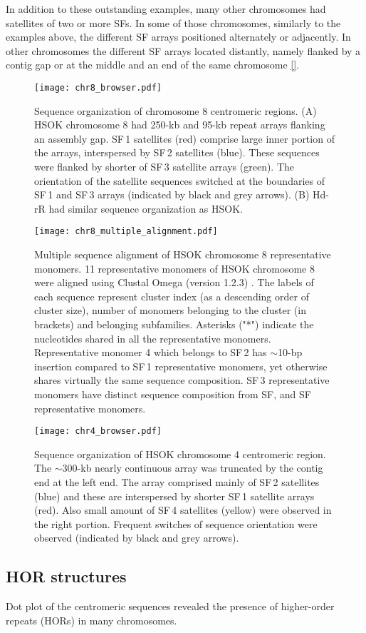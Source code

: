   In addition to these outstanding examples, many other chromosomes had satellites of two or more SFs. In some of those chromosomes, similarly to the examples above, the different SF arrays positioned alternately or adjacently. In other chromosomes the different SF arrays located distantly, namely flanked by a contig gap or at the middle and an end of the same chromosome \ref{}.


  \begin{figure*}
    \centering
    \texttt{[image: chr8\_browser.pdf]}
    \caption{
      Sequence organization of chromosome 8 centromeric regions. (A) HSOK chromosome 8 had 250-kb and 95-kb repeat arrays flanking an assembly gap. SF\,1 satellites (red) comprise large inner portion of the arrays, interspersed by SF\,2 satellites (blue). These sequences were flanked by shorter of SF\,3 satellite arrays (green). The orientation of the satellite sequences switched at the boundaries of SF\,1 and SF\,3 arrays (indicated by black and grey arrows). (B) Hd-rR had similar sequence organization as HSOK.
    }
    \label{chr8_browser}
  \end{figure*}

  \begin{figure*}
    \centering
    \texttt{[image: chr8\_multiple\_alignment.pdf]}
    \caption{
      Multiple sequence alignment of HSOK chromosome 8 representative monomers. 11 representative monomers of HSOK chromosome 8 were aligned using Clustal Omega (version 1.2.3) \cite{Sievers2011}. The labels of each sequence represent cluster index (as a descending order of cluster size), number of monomers belonging to the cluster (in brackets) and belonging subfamilies. Asterisks ("*") indicate the nucleotides shared in all the representative monomers. Representative monomer 4 which belongs to SF\,2 has $\sim$10-bp insertion compared to SF\,1 representative monomers, yet otherwise shares virtually the same sequence composition. SF\,3 representative monomers have distinct sequence composition from SF\1, and SF\2 representative monomers.
    }
    \label{chr8_multiple_alignment}
  \end{figure*}

  \begin{figure*}
    \centering
    \texttt{[image: chr4\_browser.pdf]}
    \caption{
      Sequence organization of HSOK chromosome 4 centromeric region. The $\sim$300-kb nearly continuous array was truncated by the contig end at the left end. The array comprised mainly of SF\,2 satellites (blue) and these are interspersed by shorter SF\,1 satellite arrays (red). Also small amount of SF\,4 satellites (yellow) were observed in the right portion. Frequent switches of sequence orientation were observed (indicated by black and grey arrows).
    }
    \label{chr4_browser}
  \end{figure*}


\subsection*{HOR structures}
  Dot plot of the centromeric sequences revealed the presence of higher-order repeats (HORs) in many chromosomes.
